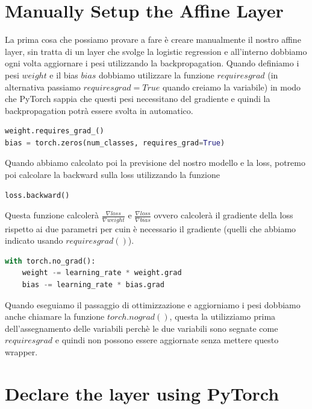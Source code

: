 \documentclass[14pt]{extreport}
\begin{document}
\section{Manually Setup the Affine Layer}

La prima cosa che possiamo provare a fare è creare manualmente il nostro affine layer, sin tratta di un layer che svolge la logistic regression e
all'interno dobbiamo ogni volta aggiornare i pesi utilizzando la backpropagation. Quando definiamo i pesi $weight$ e il bias $bias$ dobbiamo
utilizzare la funzione $requiresgrad$ (in alternativa passiamo $requiresgrad = True$ quando creiamo la variabile) in modo che PyTorch sappia che
questi pesi necessitano del gradiente e quindi la backpropagation potrà essere svolta in automatico.

\begin{lstlisting}[language=Python]
weight.requires_grad_()
bias = torch.zeros(num_classes, requires_grad=True)
\end{lstlisting}

Quando abbiamo calcolato poi la previsione del nostro modello e la loss, potremo poi calcolare la backward sulla loss utilizzando la funzione

\begin{lstlisting}[language=Python]
loss.backward()
\end{lstlisting}

Questa funzione calcolerà $\frac{\nabla loss}{\nabla weight}$ e $\frac{\nabla loss}{\nabla bias}$ ovvero calcolerà il gradiente della loss rispetto ai
due parametri per cuin è necessario il gradiente (quelli che abbiamo indicato usando $requiresgrad()$).

\begin{lstlisting}[language=Python]
with torch.no_grad():
	weight -= learning_rate * weight.grad
    bias -= learning_rate * bias.grad
\end{lstlisting}

Quando eseguiamo il passaggio di ottimizzazione e aggiorniamo i pesi dobbiamo anche chiamare la funzione $torch.nograd()$, questa la utilizziamo prima
dell'assegnamento delle variabili perchè le due variabili sono segnate come $requiresgrad$ e quindi non possono essere aggiornate senza mettere questo
wrapper.

\section{Declare the layer using PyTorch}
\end{document}
